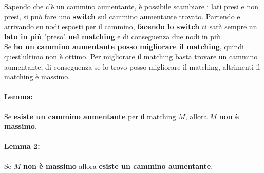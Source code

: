 Sapendo che c'è un cammino aumentante, è possibile scambiare i lati presi e non presi, si può fare uno \textbf{switch} sul cammino aumentante trovato. Partendo e arrivando su nodi esposti per il cammino, \textbf{facendo lo switch} ci sarà sempre un \textbf{lato in più} "preso" \textbf{nel matching} e di conseguenza due nodi in più.\\

Se \textbf{ho un cammino aumentante posso migliorare il matching}, quindi quest'ultimo non è ottimo. Per migliorare il matching basta trovare un cammino aumentante, di conseguenza se lo trovo posso migliorare il matching, altrimenti il matching è massimo.\\

\paragraph{Lemma:} Se \textbf{esiste un cammino aumentante} per il matching $M$, allora $M$ \textbf{non è massimo}.\\

\paragraph{Lemma 2:} Se $M$ \textbf{non è massimo} allora \textbf{esiste un cammino aumentante}.\\

